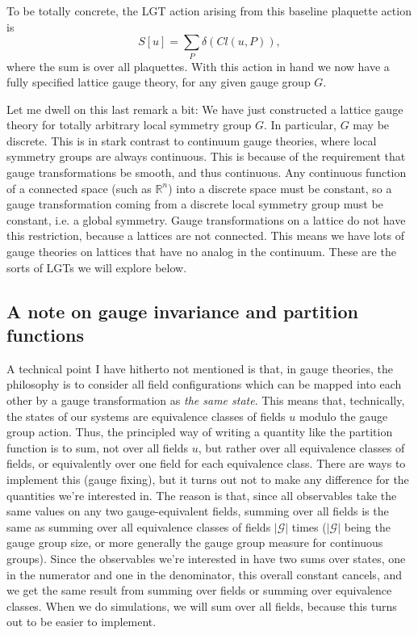 \documentclass[9pt,twocolumn,twoside]{article}
\begin{document}
To be totally concrete, the LGT action arising from this baseline plaquette action is 
\[S[u] = \sum_P \delta\left(Cl(u,P)\right),\]
where the sum is over all plaquettes.  With this action in hand we now have a fully specified lattice gauge theory, for any given gauge group $G$.  

Let me dwell on this last remark a bit: We have just constructed a lattice gauge theory for totally arbitrary local symmetry group $G$.  In particular, $G$ may be discrete.  This is in stark contrast to continuum gauge theories, where local symmetry groups are always continuous.  This is because of the requirement that gauge transformations be smooth, and thus continuous.  Any continuous function of a connected space (such as $\mathbb{R}^n$) into a discrete space must be constant, so a gauge transformation coming from a discrete local symmetry group must be constant, i.e. a global symmetry.  Gauge transformations on a lattice do not have this restriction, because a lattices are not connected.  This means we have lots of gauge theories on lattices that have no analog in the continuum.  These are the sorts of LGTs we will explore below. 

\subsection{A note on gauge invariance and partition functions}
A technical point I have hitherto not mentioned is that, in gauge theories, the philosophy is to consider all field configurations which can be mapped into each other by a gauge transformation as \textit{the same state}.  This means that, technically, the states of our systems are equivalence classes of fields $u$ modulo the gauge group action.  Thus, the principled way of writing a quantity like the partition function is to sum, not over all fields $u$, but rather over all equivalence classes of fields, or equivalently over one field for each equivalence class.  There are ways to implement this (gauge fixing), but it turns out not to make any difference for the quantities we're interested in.  The reason is that, since all observables take the same values on any two gauge-equivalent fields, summing over all fields is the same as summing over all equivalence classes of fields $|\mathcal{G}|$ times ($|\mathcal{G}|$ being the gauge group size, or more generally the gauge group measure for continuous groups).  Since the observables we're interested in have two sums over states, one in the numerator and one in the denominator, this overall constant cancels, and we get the same result from summing over fields or summing over equivalence classes.  When we do simulations, we will sum over all fields, because this turns out to be easier to implement.
\end{document}
